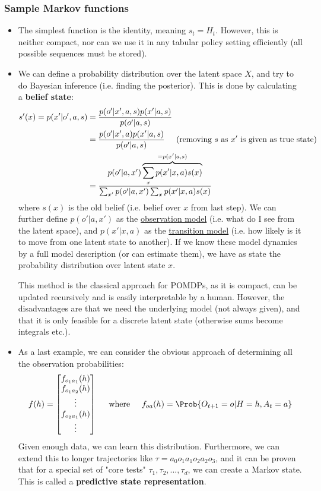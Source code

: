 \subsubsection{Sample Markov functions}
\begin{itemize}
	\item The simplest function is the identity, meaning $s_t=H_t$. However, this is neither compact, nor can we use it in any tabular policy setting efficiently (all possible sequences must be stored).
	\item We can define a probability distribution over the latent space $X$, and try to do Bayesian inference (i.e. finding the posterior). This is done by calculating a \textbf{belief state}:
	\begin{equation*}
		\begin{split}
			s'(x)=p(x'|o',a,s)& =\frac{p(o'|x',a,s)p(x'|a,s)}{p(o'|a,s)}\\
			& = \frac{p(o'|x',a)p(x'|a,s)}{p(o'|a,s)}\hspace{5mm}\text{(removing $s$ as $x'$ is given as true state)}\\
			& = \frac{p(o'|a,x')\overbrace{\sum_x p(x'|x,a)s(x)}^{=p(x'|a,s)}}{\sum_{x'}p(o'|a,x')\sum_x p(x'|x,a)s(x)}
		\end{split}
	\end{equation*}
	where $s(x)$ is the old belief (i.e. belief over $x$ from last step). We can further define $p(o'|a,x')$ as the \underline{observation model} (i.e. what do I see from the latent space), and $p(x'|x,a)$ as the \underline{transition model} (i.e. how likely is it to move from one latent state to another). If we know these model dynamics by a full model description (or can estimate them), we have as state the probability distribution over latent state $x$.
	
	This method is the classical approach for POMDPs, as it is compact, can be updated recursively and is easily interpretable by a human. However, the disadvantages are that we need the underlying model (not always given), and that it is only feasible for a discrete latent state (otherwise sums become integrals etc.).
	\item As a last example, we can consider the obvious approach of determining all the observation probabilities:
	$$f(h)=\begin{bmatrix}
	f_{o_1a_1}(h)\\ f_{o_1a_2}(h)\\\vdots\\f_{o_2a_1}(h)\\\vdots\\
	\end{bmatrix}\hspace{5mm}\text{where}\hspace{5mm}f_{oa}(h)=\Prob{O_{t+1}=o|H=h,A_t=a}$$
	Given enough data, we can learn this distribution. Furthermore, we can extend this to longer trajectories like $\tau=a_0o_1a_1o_2a_2o_3$, and it can be proven that for a special set of "core tests" $\tau_1,\tau_2,...,\tau_d$, we can create a Markov state. This is called a \textbf{predictive state representation}.
	

\end{itemize}
